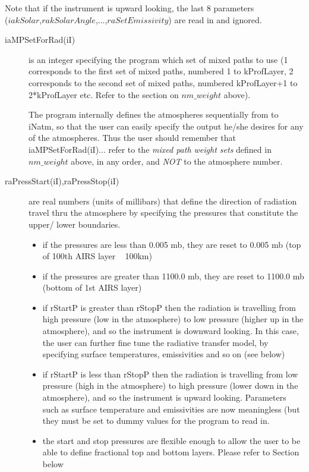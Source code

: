 \documentclass[12pt]{article}
\begin{document}
{\smallskip\noindent
Note that if the instrument is upward looking, the last 8 parameters \\
($iakSolar$,$rakSolarAngle$,...,$raSetEmissivity$) are read in and ignored.  

\begin{description}

\item[{\sf iaMPSetForRad(iI)}] is an integer specifying the program which set 
of mixed paths to use (1 corresponds to the first set of mixed paths,
numbered 1 to kProfLayer, 2 corresponds to the second set of mixed paths,
numbered kProfLayer+1 to 2*kProfLayer etc.  Refer to the section on 
$nm\_weight$ above).

The program internally defines the atmospheres sequentially 
from {} to {\sf iNatm}, so that the user can easily specify the 
output he/she desires for any of the atmospheres. Thus the user should 
remember that {\sf iaMPSetForRad(iI)...} refer to the {\em mixed path weight 
sets} defined in $nm\_weight$ above, in any order, and {\em NOT} to the 
atmosphere number.

\item[{\sf raPressStart(iI),raPressStop(iI)}] are real numbers (units of 
millibars) that define the direction of radiation travel thru the atmosphere by
specifying the pressures that constitute the upper/ lower boundaries.

\begin{itemize}
\item if the pressures are less than 0.005 mb, they are reset to 0.005
  mb (top of 100th AIRS layer ~ 100km)
\item if the pressures are greater than 1100.0 mb, they are reset to
  1100.0 mb (bottom of 1st AIRS layer)
\item if {\sf rStartP} is greater than {\sf rStopP} then the radiation is
  travelling from high pressure (low in the atmosphere) to low
  pressure (higher up in the atmosphere), and so the instrument is
  downward looking.  In this case, the user can further fine tune the
  radiative transfer model, by specifying surface temperatures,
  emissivities and so on (see below)
\item if {\sf rStartP} is less than {\sf rStopP} then the radiation is
  travelling from low pressure (high in the atmosphere) to high
  pressure (lower down in the atmosphere), and so the instrument is
  upward looking.  Parameters such as surface temperature and
  emissivities are now meaningless (but they {\sf must} be set to
  dummy values for the program to read in.
\item the start and stop pressures are flexible enough to allow the
  user to be able to define fractional top and bottom layers.  Please
  refer to Section \cite{FractionalLayers} below
\end{itemize}


\end{description}}
\end{document}
